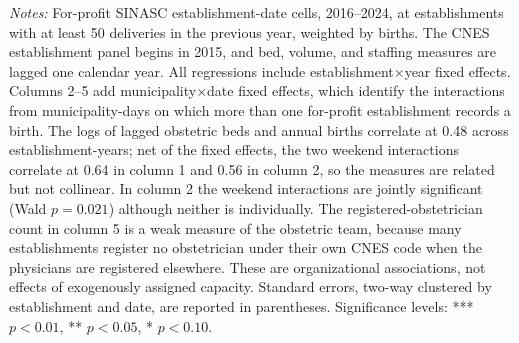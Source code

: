 \begin{table}
{\begin{tabular}{lccccc}
\bottomrule
   \end{tabular}
}
\begin{minipage}{\linewidth}\footnotesize
\textit{Notes:} For-profit SINASC establishment-date cells, 2016--2024, at establishments with at least 50 deliveries in the previous year, weighted by births. The CNES establishment panel begins in 2015, and bed, volume, and staffing measures are lagged one calendar year. All regressions include establishment$\times$year fixed effects. Columns 2--5 add municipality$\times$date fixed effects, which identify the interactions from municipality-days on which more than one for-profit establishment records a birth. The logs of lagged obstetric beds and annual births correlate at 0.48 across establishment-years; net of the fixed effects, the two weekend interactions correlate at 0.64 in column 1 and 0.56 in column 2, so the measures are related but not collinear. In column 2 the weekend interactions are jointly significant (Wald $p=0.021$) although neither is individually. The registered-obstetrician count in column 5 is a weak measure of the obstetric team, because many establishments register no obstetrician under their own CNES code when the physicians are registered elsewhere. These are organizational associations, not effects of exogenously assigned capacity. Standard errors, two-way clustered by establishment and date, are reported in parentheses.
\newline
\footnotesize Significance levels: *** $p<0.01$, ** $p<0.05$, * $p<0.10$.
\end{minipage}
\end{table}


